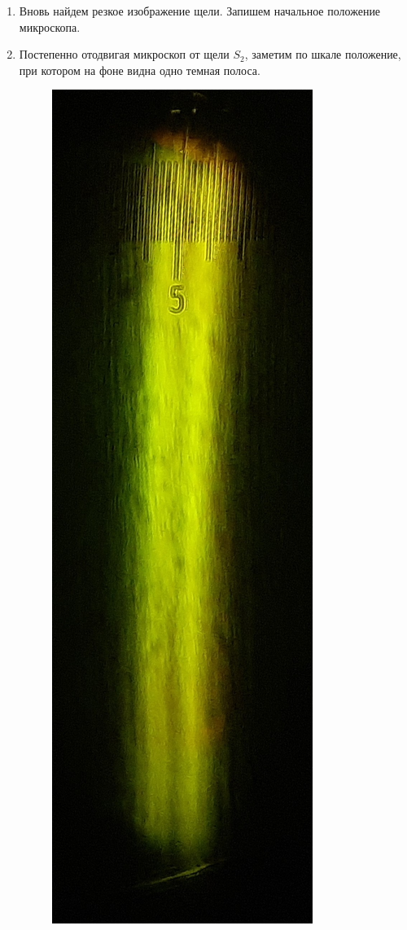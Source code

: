 \documentclass[14pt, a4paper]{report}
\begin{document}
\begin{enumerate}

\item Вновь найдем резкое изображение щели. Запишем начальное положение микроскопа.

\item Постепенно отодвигая микроскоп от щели $S_2$, заметим по шкале положение, при котором на фоне видна одно темная полоса.

\begin{figure}[H]
\centering
\begin{minipage}{.33\textwidth}
  \centering
  \includegraphics[width=.75\linewidth]{../images/431m_2}

\end{minipage}
\end{figure}
\end{enumerate}
\end{document}
